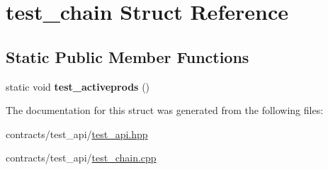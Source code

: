 \hypertarget{structtest__chain}{}\section{test\+\_\+chain Struct Reference}
\label{structtest__chain}
\subsection*{Static Public Member Functions}
\begin{DoxyCompactItemize}
\item 
\mbox{\label{structtest__chain_a4944de4835d772f5a5fc91d081abefca}} 
static void {\bfseries test\+\_\+activeprods} ()
\end{DoxyCompactItemize}


The documentation for this struct was generated from the following files\+:\begin{DoxyCompactItemize}
\item 
contracts/test\+\_\+api/\mbox{\hyperlink{test__api_8hpp}{test\+\_\+api.\+hpp}}\item 
contracts/test\+\_\+api/\mbox{\hyperlink{test__chain_8cpp}{test\+\_\+chain.\+cpp}}\end{DoxyCompactItemize}
